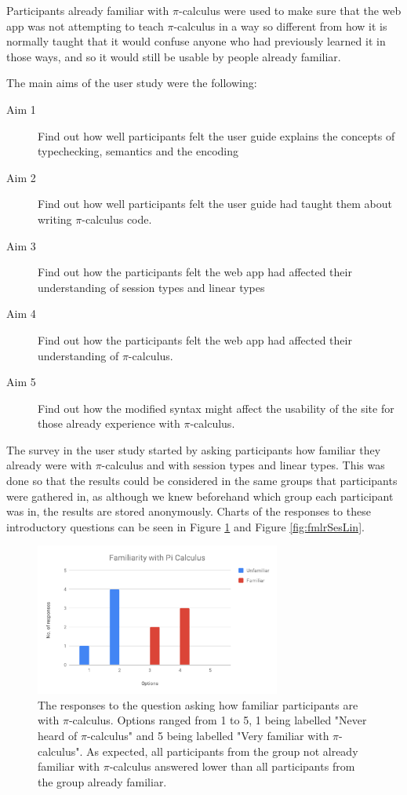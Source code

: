 \documentclass{l4proj}
\begin{document}
\quad Participants already familiar with $\pi$-calculus were used to make sure that the web app was not attempting to teach $\pi$-calculus in a way so different from how it is normally taught that it would confuse anyone who had previously learned it in those ways, and so it would still be usable by people already familiar.

\quad The main aims of the user study were the following:
\begin{description}
    \item [Aim 1] Find out how well participants felt the user guide explains the concepts of typechecking, semantics and the encoding
    \item [Aim 2] Find out how well participants felt the user guide had taught them about writing $\pi$-calculus code.
    \item [Aim 3] Find out how the participants felt the web app had affected their understanding of session types and linear types
    \item [Aim 4] Find out how the participants felt the web app had affected their understanding of $\pi$-calculus.
    \item [Aim 5] Find out how the modified syntax might affect the usability of the site for those already experience with $\pi$-calculus.
\end{description}

\quad The survey in the user study started by asking participants how familiar they already were with $\pi$-calculus and with session types and linear types. This was done so that the results could be considered in the same groups that participants were gathered in, as although we knew beforehand which group each participant was in, the results are stored anonymously. Charts of the responses to these introductory questions can be seen in Figure \ref{fig:fmlrPiCalc} and Figure \ref{fig:fmlrSesLin}.

\begin{figure}[H]
\centering
\includegraphics[width=0.72\textwidth]{images/PiCalcFamiliar.pdf}
\caption{The responses to the question asking how familiar participants are with $\pi$-calculus. Options ranged from 1 to 5, 1 being labelled "Never heard of $\pi$-calculus" and 5 being labelled "Very familiar with $\pi$-calculus". As expected, all participants from the group not already familiar with $\pi$-calculus answered lower than all participants from the group already familiar.}
\label{fig:fmlrPiCalc}
\end{figure}
\end{document}
